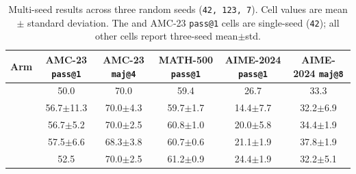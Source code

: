 \begin{table}[t]
\centering\small
\caption{Multi-seed results across three random seeds (\texttt{42, 123, 7}).
Cell values are mean $\pm$ standard deviation. The \base{} and \armD{}
AMC-23 \texttt{pass@1} cells are single-seed (\texttt{42}); all other cells
report three-seed mean$\pm$std.}
\label{tab:main}
\begin{tabular}{lccccc}
\toprule
Arm & AMC-23 \texttt{pass@1} & AMC-23 \texttt{maj@4} & MATH-500 \texttt{pass@1} & AIME-2024 \texttt{pass@1} & AIME-2024 \texttt{maj@8} \\
\midrule
\base{} & 50.0 & 70.0 & 59.4 & 26.7 & 33.3 \\
\armA{} & 56.7$\pm$11.3 & 70.0$\pm$4.3 & 59.7$\pm$1.7 & 14.4$\pm$7.7 & 32.2$\pm$6.9 \\
\armB{} & 56.7$\pm$5.2  & 70.0$\pm$2.5 & 60.8$\pm$1.0 & 20.0$\pm$5.8 & 34.4$\pm$1.9 \\
\armC{} & 57.5$\pm$6.6  & 68.3$\pm$3.8 & 60.7$\pm$0.6 & 21.1$\pm$1.9 & 37.8$\pm$1.9 \\
\armD{} & 52.5          & 70.0$\pm$2.5 & 61.2$\pm$0.9 & 24.4$\pm$1.9 & 32.2$\pm$5.1 \\
\bottomrule
\end{tabular}
\end{table}
